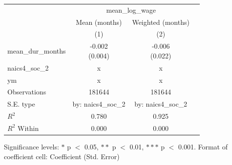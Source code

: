 \renewcommand\cellalign{t}
\begin{threeparttable}
\begin{tabular}{lccc}
\toprule
 & \multicolumn{2}{c}{mean_log_wage} \\
\cmidrule(lr){2-3} 
 & Mean (months) & Weighted (months) \\
 & (1) & (2) \\
\midrule
\addlinespace
mean_dur_months & \makecell{-0.002 \\ (0.004)} & \makecell{-0.006 \\ (0.022)} \\
\midrule
\addlinespace
naics4_soc_2 & x & x \\
ym & x & x \\
\midrule
\addlinespace
Observations & 181644 & 181644 \\
S.E. type & by: naics4_soc_2 & by: naics4_soc_2 \\
$R^2$ & 0.780 & 0.925 \\
$R^2$ Within & 0.000 & 0.000 \\
\bottomrule
\end{tabular}
\footnotesize Significance levels: $*$ p $<$ 0.05, $**$ p $<$ 0.01, $***$ p $<$ 0.001. Format of coefficient cell: Coefficient 
 (Std. Error)
\end{threeparttable}